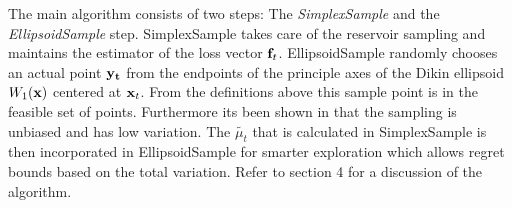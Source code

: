 The main algorithm consists of two steps: The \textit{SimplexSample} and the \textit{EllipsoidSample} step.
SimplexSample takes care of the reservoir sampling and maintains the estimator of the loss vector
${\bf f}_t$. EllipsoidSample randomly chooses an actual point ${\bf y_t}$ from the endpoints of the
principle axes of the Dikin ellipsoid $W_1({\bf x})$ centered at ${\bf x}_t$. From the definitions above this sample point is in the feasible set of points. Furthermore its been shown in \citep{abernethy} that the sampling is unbiased and has low variation. The $\tilde{\mu_t}$ that is calculated in SimplexSample is then incorporated in EllipsoidSample for smarter exploration which allows regret bounds based on the total
variation. Refer to section 4 for a discussion of the algorithm.


